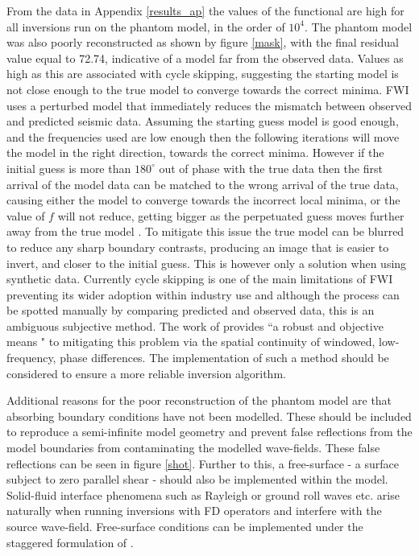 From the data in Appendix \ref{results_ap} the values of the functional are high for all inversions run on the phantom model, in the order of {$10^{4}$}. The phantom model was also poorly reconstructed as shown by figure \ref{mask}, with the final residual value equal to 72.74, indicative of a model far from the observed data. Values as high as this are associated with cycle skipping, suggesting the starting model is not close enough to the true model to converge towards the correct minima. FWI uses a perturbed model that immediately reduces the mismatch between observed and predicted seismic data. Assuming the starting guess model is good enough, and the frequencies used are low enough then the following iterations will move the model in the right direction, towards the correct minima. However if the initial guess is more than $180^{\circ}$ out of phase with the true data then the first arrival of the model data can be matched to the wrong arrival of the true data, causing either the model to converge towards the incorrect local minima, or the value of $f$ will not reduce, getting bigger as the perpetuated guess moves further away from the true model \citep{shah2012quality}. To mitigate this issue the true model can be blurred to reduce any sharp boundary contrasts, producing an image that is easier to invert, and closer to the initial guess. This is however only a solution when using synthetic data. Currently cycle skipping is one of the main limitations of FWI preventing its wider adoption within industry use and although the process can be spotted manually by comparing predicted and observed data, this is an ambiguous subjective method. The work of \citet{shah2012quality} provides ``a robust and objective means " to mitigating this problem via the spatial continuity of windowed, low-frequency, phase differences. The implementation of such a method should be considered to ensure a more reliable inversion algorithm. \par

Additional reasons for the poor reconstruction of the phantom model are that absorbing boundary conditions have not been modelled. These should be included to reproduce a semi-infinite model geometry and prevent false reflections from the model boundaries from contaminating the modelled wave-fields. These false reflections can be seen in figure \ref{shot}.  Further to this, a free-surface - a surface subject to zero parallel shear - should also be implemented within the model. Solid-fluid interface phenomena such as Rayleigh or ground roll waves etc. arise naturally when running inversions with FD operators and interfere with the source wave-field. Free-surface conditions can be implemented under the staggered formulation of \citet{moczo20023d}. 

